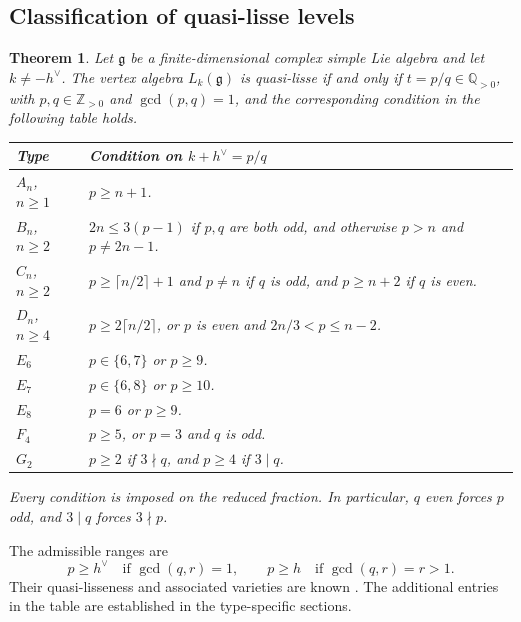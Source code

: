 \documentclass[11pt,a4paper]{amsart}
\numberwithin{equation}{section}
\newtheorem{theorem}{Theorem}[section]
\theoremstyle{definition}
\theoremstyle{remark}
\newcommand{\Z}{\mathbb Z}
\newcommand{\Q}{\mathbb Q}
\newcommand{\g}{\mathfrak g}
\begin{document}
\subsection{Classification of quasi-lisse levels}
\begin{theorem}\label{thm:classification}\label{thm:classical-classification}
Let $\g$ be a finite-dimensional complex simple Lie algebra and let
$k\ne-h^\vee$. The vertex algebra
$L_k(\g)$ is quasi-lisse if and only if $t=p/q\in\Q_{>0}$,
with $p,q\in\Z_{>0}$ and $\gcd(p,q)=1$, and the corresponding
condition in the following table holds.
\begin{center}\small
\renewcommand{\arraystretch}{1.24}
\begin{tabular}{@{}p{}p{}@{}}\toprule
Type&Condition on $k+h^\vee=p/q$\\\midrule
$A_n$, $n\ge1$&$p\ge n+1$.\\
$B_n$, $n\ge2$&
 $2n\le3(p-1)$ if $p,q$ are both odd, and otherwise $p>n$ and $p\ne2n-1$.\\
$C_n$, $n\ge2$&
 $p\ge\lceil n/2\rceil+1$ and $p\ne n$ if $q$ is odd, and
 $p\ge n+2$ if $q$ is even.\\
$D_n$, $n\ge4$&
 $p\ge2\lceil n/2\rceil$, or $p$ is even and $2n/3<p\le n-2$.\\
$E_6$&$p\in\{6,7\}$ or $p\ge9$.\\
$E_7$&$p\in\{6,8\}$ or $p\ge10$.\\
$E_8$&$p=6$ or $p\ge9$.\\
$F_4$&$p\ge5$, or $p=3$ and $q$ is odd.\\
$G_2$&$p\ge2$ if $3\nmid q$, and $p\ge4$ if $3\mid q$.\\\bottomrule
\end{tabular}
\end{center}
Every condition is imposed on the \emph{reduced} fraction. In particular,
$q$ even forces $p$ odd, and $3\mid q$ forces $3\nmid p$.
\end{theorem}

The admissible ranges are
\begin{equation}\label{eq:admissible-general}
 p\ge h^\vee\quad\text{if }\gcd(q,r)=1,
 \qquad
 p\ge h\quad\text{if }\gcd(q,r)=r>1.
\end{equation}
Their quasi-lisseness and associated varieties are known
\cite{AAV,AVEM}. The additional entries in the table are established
in the type-specific sections.
\end{document}
